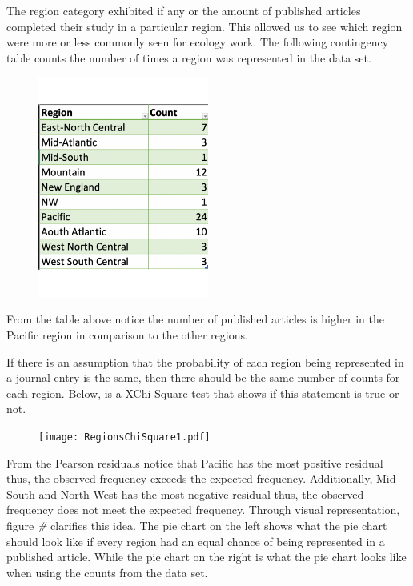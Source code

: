 \documentclass[
]{article}
\begin{document}
The region category exhibited if any or the amount of published articles
completed their study in a particular region. This allowed us to see
which region were more or less commonly seen for ecology work. The
following contingency table counts the number of times a region was
represented in the data set.

\begin{figure}
    \centering
    \includegraphics[width=0.50\textwidth]{RegionsContingencyTable.pdf}
    \label{fig:Contingency Table}
\end{figure}

From the table above notice the number of published articles is higher
in the Pacific region in comparison to the other regions.

If there is an assumption that the probability of each region being
represented in a journal entry is the same, then there should be the
same number of counts for each region. Below, is a XChi-Square test that
shows if this statement is true or not.

\begin{figure}
    \centering
    \texttt{[image: RegionsChiSquare1.pdf]}
    \label{fig:Region XChi-Square}
\end{figure}

From the Pearson residuals notice that Pacific has the most positive
residual thus, the observed frequency exceeds the expected frequency.
Additionally, Mid-South and North West has the most negative residual
thus, the observed frequency does not meet the expected frequency.
Through visual representation, figure \emph{\#} clarifies this idea. The
pie chart on the left shows what the pie chart should look like if every
region had an equal chance of being represented in a published article.
While the pie chart on the right is what the pie chart looks like when
using the counts from the data set.
\end{document}
